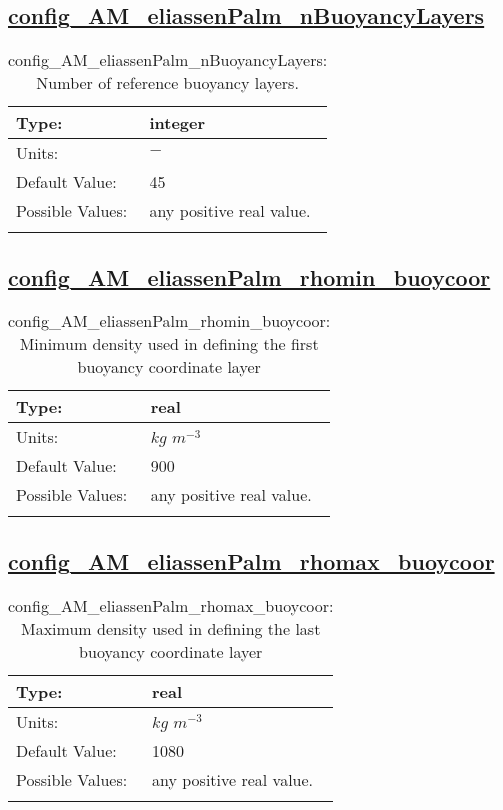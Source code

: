 \subsection[config\_AM\_eliassenPalm\_nBuoyancyLayers]{\hyperref[sec:nm_tab_AM_eliassenPalm]{config\_AM\_eliassenPalm\_nBuoyancyLayers}}
\label{subsec:nm_sec_config_AM_eliassenPalm_nBuoyancyLayers}
\begin{center}
\begin{longtable}{| p{2.0in} || p{4.0in} |}
    \hline
    Type: & integer \\
    \hline
    Units: & $-$ \\
    \hline
    Default Value: & 45 \\
    \hline
    Possible Values: & any positive real value. \\
    \hline
    \caption{config\_AM\_eliassenPalm\_nBuoyancyLayers: Number of reference buoyancy layers.}
\end{longtable}
\end{center}
\subsection[config\_AM\_eliassenPalm\_rhomin\_buoycoor]{\hyperref[sec:nm_tab_AM_eliassenPalm]{config\_AM\_eliassenPalm\_rhomin\_buoycoor}}
\label{subsec:nm_sec_config_AM_eliassenPalm_rhomin_buoycoor}
\begin{center}
\begin{longtable}{| p{2.0in} || p{4.0in} |}
    \hline
    Type: & real \\
    \hline
    Units: & $kg$ $m^{-3}$ \\
    \hline
    Default Value: & 900 \\
    \hline
    Possible Values: & any positive real value. \\
    \hline
    \caption{config\_AM\_eliassenPalm\_rhomin\_buoycoor: Minimum density used in defining the first buoyancy coordinate layer}
\end{longtable}
\end{center}
\subsection[config\_AM\_eliassenPalm\_rhomax\_buoycoor]{\hyperref[sec:nm_tab_AM_eliassenPalm]{config\_AM\_eliassenPalm\_rhomax\_buoycoor}}
\label{subsec:nm_sec_config_AM_eliassenPalm_rhomax_buoycoor}
\begin{center}
\begin{longtable}{| p{2.0in} || p{4.0in} |}
    \hline
    Type: & real \\
    \hline
    Units: & $kg$ $m^{-3}$ \\
    \hline
    Default Value: & 1080 \\
    \hline
    Possible Values: & any positive real value. \\
    \hline
    \caption{config\_AM\_eliassenPalm\_rhomax\_buoycoor: Maximum density used in defining the last buoyancy coordinate layer}
\end{longtable}
\end{center}
